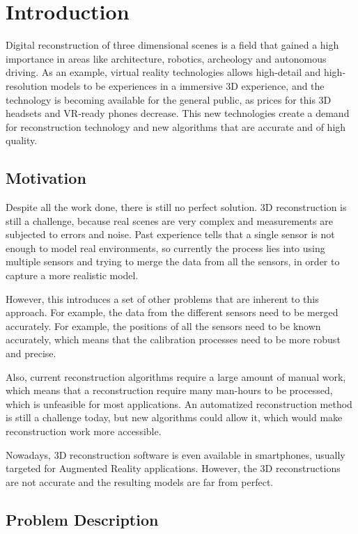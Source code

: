 \chapter{Introduction}

Digital reconstruction of three dimensional scenes is a field that gained a high importance in areas like architecture, robotics, archeology and autonomous driving. As an example, virtual reality technologies allows high-detail and high-resolution models to be experiences in a immersive 3D experience, and the technology is becoming available for the general public, as prices for this 3D headsets and VR-ready phones decrease. This new technologies create a demand for reconstruction technology and new algorithms that are accurate and of high quality.

\section{Motivation}


Despite all the work done, there is still no perfect solution. 3D reconstruction is still a challenge, because real scenes are very complex and measurements are subjected to errors and noise. Past experience tells that a single sensor is not enough to model real environments, so currently the process lies into using multiple sensors and trying to merge the data from all the sensors, in order to capture a more realistic model.

However, this introduces a set of other problems that are inherent to this approach. For example, the data from the different sensors need to be merged accurately. For example, the positions of all the sensors need to be known accurately, which means that the calibration processes need to be more robust and precise.

Also, current reconstruction algorithms require a large amount of manual work, which means that a reconstruction require many man-hours to be processed, which is unfeasible for most applications. An automatized reconstruction method is still a challenge today, but new algorithms could allow it, which would make reconstruction work more accessible.

Nowadays, 3D reconstruction software is even available in smartphones, usually targeted for Augmented Reality applications. However, the 3D reconstructions are not accurate and the resulting models are far from perfect.

\section{Problem Description}

